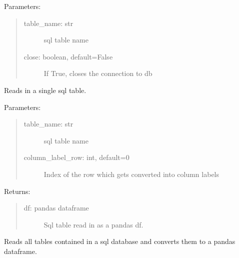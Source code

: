 \documentclass[letterpaper,10pt,english,openany]{sphinxmanual}
\begin{document}
\begin{fulllineitems}
\begin{fulllineitems}
Parameters:
\begin{quote}
\begin{description}
\item[{table\_name: str}] \leavevmode
sql table name

\item[{close: boolean, default=False}] \leavevmode
If True, closes the connection to db

\end{description}
\end{quote}

\end{fulllineitems}


\begin{fulllineitems}
\label{\detokenize{source/mswh.comm:mswh.comm.sql.Sql.table2pd}}
Reads in a single sql table.

Parameters:
\begin{quote}
\begin{description}
\item[{table\_name: str}] \leavevmode
sql table name

\item[{column\_label\_row: int, default=0}] \leavevmode
Index of the row which gets
converted into column labels

\end{description}
\end{quote}

Returns:
\begin{quote}
\begin{description}
\item[{df: pandas dataframe}] \leavevmode
Sql table read in as a pandas df.

\end{description}
\end{quote}

\end{fulllineitems}


\begin{fulllineitems}
\label{\detokenize{source/mswh.comm:mswh.comm.sql.Sql.tables2dict}}
Reads all tables contained in a
sql database and converts them to a
pandas dataframe.


\end{fulllineitems}
\end{fulllineitems}
\end{document}
